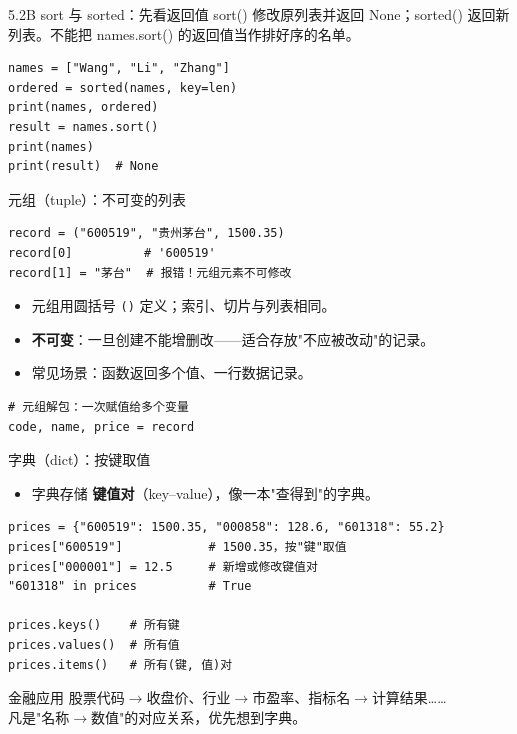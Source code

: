 \documentclass[9pt]{ctexbeamer}
\begin{document}
\begin{frame}[fragile]{5.2B sort 与 sorted：先看返回值}
\small sort() 修改原列表并返回 None；sorted() 返回新列表。不能把 names.sort() 的返回值当作排好序的名单。
\medskip
\begin{lstlisting}
names = ["Wang", "Li", "Zhang"]
ordered = sorted(names, key=len)
print(names, ordered)
result = names.sort()
print(names)
print(result)  # None
\end{lstlisting}
\end{frame}

\begin{frame}[fragile]{元组（tuple）：不可变的列表}
	\begin{lstlisting}
record = ("600519", "贵州茅台", 1500.35)
record[0]          # '600519'
record[1] = "茅台"  # 报错！元组元素不可修改
\end{lstlisting}
	\begin{itemize}
		\item 元组用圆括号 \texttt{()} 定义；索引、切片与列表相同。
		\item \textbf{不可变}：一旦创建不能增删改——适合存放"不应被改动"的记录。
		\item 常见场景：函数返回多个值、一行数据记录。
	\end{itemize}
	\begin{lstlisting}
# 元组解包：一次赋值给多个变量
code, name, price = record
\end{lstlisting}
\end{frame}

\begin{frame}[fragile]{字典（dict）：按键取值}
	\begin{itemize}
		\item 字典存储 \textbf{键值对}（key--value），像一本"查得到"的字典。
	\end{itemize}
	\begin{lstlisting}
prices = {"600519": 1500.35, "000858": 128.6, "601318": 55.2}
prices["600519"]            # 1500.35，按"键"取值
prices["000001"] = 12.5     # 新增或修改键值对
"601318" in prices          # True

prices.keys()    # 所有键
prices.values()  # 所有值
prices.items()   # 所有(键, 值)对
\end{lstlisting}
	\begin{exampleblock}{金融应用}
		股票代码$\to$收盘价、行业$\to$市盈率、指标名$\to$计算结果……\\
		凡是"名称$\to$数值"的对应关系，优先想到字典。
	\end{exampleblock}
\end{frame}
\end{document}

